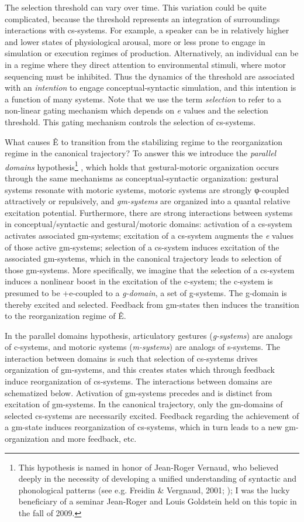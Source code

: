   The selection threshold can vary over time. This variation could be quite complicated, because the threshold represents an integration of surroundings interactions with cs-systems. For example, a speaker can be in relatively higher and lower states of physiological arousal, more or less prone to engage in simulation or execution regimes of production. Alternatively, an individual can be in a regime where they direct attention to environmental stimuli, where motor sequencing must be inhibited. Thus the dynamics of the threshold are associated with an \textit{intention} to engage conceptual-syntactic simulation, and this intention is a function of many systems. Note that we use the term \textit{selection} to refer to a non-linear gating mechanism which depends on \textit{e} values and the selection threshold. This gating mechanism controls the selection of cs-systems.

  What causes Ê to transition from the stabilizing regime to the reorganization regime in the canonical trajectory? To answer this we introduce the \textit{parallel} \textit{domains} hypothesis\footnote{This hypothesis is named in honor of Jean-Roger Vernaud, who believed deeply in the necessity of developing a unified understanding of syntactic and phonological patterns (see e.g. Freidin \& Vergnaud, 2001; \citealt{Vergnaud1977}); I was the lucky beneficiary of a seminar Jean-Roger and Louis Goldstein held on this topic in the fall of 2009.} , which holds that gestural-motoric organization occurs through the same mechanisms as conceptual-syntactic organization: gestural systems resonate with motoric systems, motoric systems are strongly φ-coupled attractively or repulsively, and \textit{gm-systems} are organized into a quantal relative excitation potential. Furthermore, there are strong interactions between systems in conceptual/syntactic and gestural/motoric domains: activation of a cs-system activates associated gm-systems; excitation of a cs-system augments the \textit{e} values of those active gm-systems; selection of a cs-system induces excitation of the associated gm-systems, which in the canonical trajectory leads to selection of those gm-systems. More specifically, we imagine that the selection of a cs-system induces a nonlinear boost in the excitation of the c-system; the c-system is presumed to be +e-coupled to a \textit{g-domain}, a set of g-systems. The g-domain is thereby excited and selected. Feedback from gm-states then induces the transition to the reorganization regime of  Ê.

  In the parallel domains hypothesis, articulatory gestures (\textit{g-systems}) are analogs of c-systems, and motoric systems (\textit{m-systems}) are analogs of s-systems. The interaction between domains is such that selection of cs-systems drives organization of gm-systems, and this creates states which through feedback induce reorganization of cs-systems. The interactions between domains are schematized below. Activation of gm-systems precedes and is distinct from excitation of gm-systems. In the canonical trajectory, only the gm-domains of selected cs-systems are necessarily excited. Feedback regarding the achievement of a gm-state induces reorganization of cs-systems, which in turn leads to a new gm-organization and more feedback, etc.

